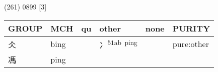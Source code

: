 \documentclass[14pt,a4paper]{scrartcl}
\begin{document}
(261) 0899 {[}3{]}

\begin{longtable}[c]{@{}llllll@{}}
\toprule
\begin{minipage}[b]{0.14\columnwidth}\raggedright\strut
GROUP
\strut\end{minipage} &
\begin{minipage}[b]{0.14\columnwidth}\raggedright\strut
MCH
\strut\end{minipage} &
\begin{minipage}[b]{0.14\columnwidth}\raggedright\strut
qu
\strut\end{minipage} &
\begin{minipage}[b]{0.14\columnwidth}\raggedright\strut
other
\strut\end{minipage} &
\begin{minipage}[b]{0.14\columnwidth}\raggedright\strut
none
\strut\end{minipage} &
\begin{minipage}[b]{0.14\columnwidth}\raggedright\strut
PURITY
\strut\end{minipage}\tabularnewline
\midrule
\endhead
\begin{minipage}[t]{0.14\columnwidth}\raggedright\strut
仌
\strut\end{minipage} &
\begin{minipage}[t]{0.14\columnwidth}\raggedright\strut
bing
\strut\end{minipage} &
\begin{minipage}[t]{0.14\columnwidth}\raggedright\strut
\strut\end{minipage} &
\begin{minipage}[t]{0.14\columnwidth}\raggedright\strut
冫\textsuperscript{51ab~ping}
\strut\end{minipage} &
\begin{minipage}[t]{0.14\columnwidth}\raggedright\strut
\strut\end{minipage} &
\begin{minipage}[t]{0.14\columnwidth}\raggedright\strut
pure:other
\strut\end{minipage}\tabularnewline
\begin{minipage}[t]{0.14\columnwidth}\raggedright\strut
馮
\strut\end{minipage} &
\begin{minipage}[t]{0.14\columnwidth}\raggedright\strut
ping
\strut\end{minipage} &
\begin{minipage}[t]{0.14\columnwidth}\raggedright\strut
\strut\end{minipage} &

\end{longtable}
\end{document}
